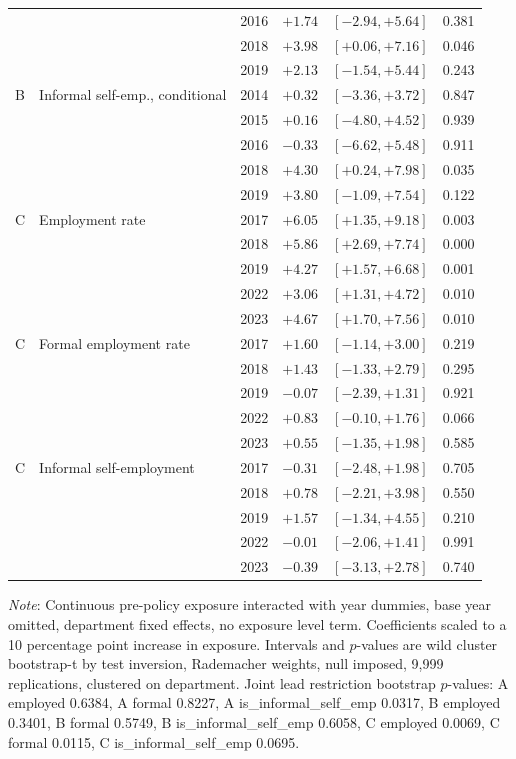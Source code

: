 \begin{table}[H]
\begin{tabular}{llrrrr}
 &  & 2016 & $+1.74$ & $[-2.94, +5.64]$ & 0.381 \\
 &  & 2018 & $+3.98$ & $[+0.06, +7.16]$ & 0.046 \\
 &  & 2019 & $+2.13$ & $[-1.54, +5.44]$ & 0.243 \\
B & Informal self-emp., conditional & 2014 & $+0.32$ & $[-3.36, +3.72]$ & 0.847 \\
 &  & 2015 & $+0.16$ & $[-4.80, +4.52]$ & 0.939 \\
 &  & 2016 & $-0.33$ & $[-6.62, +5.48]$ & 0.911 \\
 &  & 2018 & $+4.30$ & $[+0.24, +7.98]$ & 0.035 \\
 &  & 2019 & $+3.80$ & $[-1.09, +7.54]$ & 0.122 \\
C & Employment rate & 2017 & $+6.05$ & $[+1.35, +9.18]$ & 0.003 \\
 &  & 2018 & $+5.86$ & $[+2.69, +7.74]$ & 0.000 \\
 &  & 2019 & $+4.27$ & $[+1.57, +6.68]$ & 0.001 \\
 &  & 2022 & $+3.06$ & $[+1.31, +4.72]$ & 0.010 \\
 &  & 2023 & $+4.67$ & $[+1.70, +7.56]$ & 0.010 \\
C & Formal employment rate & 2017 & $+1.60$ & $[-1.14, +3.00]$ & 0.219 \\
 &  & 2018 & $+1.43$ & $[-1.33, +2.79]$ & 0.295 \\
 &  & 2019 & $-0.07$ & $[-2.39, +1.31]$ & 0.921 \\
 &  & 2022 & $+0.83$ & $[-0.10, +1.76]$ & 0.066 \\
 &  & 2023 & $+0.55$ & $[-1.35, +1.98]$ & 0.585 \\
C & Informal self-employment & 2017 & $-0.31$ & $[-2.48, +1.98]$ & 0.705 \\
 &  & 2018 & $+0.78$ & $[-2.21, +3.98]$ & 0.550 \\
 &  & 2019 & $+1.57$ & $[-1.34, +4.55]$ & 0.210 \\
 &  & 2022 & $-0.01$ & $[-2.06, +1.41]$ & 0.991 \\
 &  & 2023 & $-0.39$ & $[-3.13, +2.78]$ & 0.740 \\
\bottomrule
\end{tabular}
\begin{minipage}{0.95\textwidth}\small
\textit{Note}: Continuous pre-policy exposure interacted with year dummies, base year omitted, department fixed effects, no exposure level term. Coefficients scaled to a 10 percentage point increase in exposure. Intervals and $p$-values are wild cluster bootstrap-t by test inversion, Rademacher weights, null imposed, 9,999 replications, clustered on department. Joint lead restriction bootstrap $p$-values: A employed 0.6384, A formal 0.8227, A is_informal_self_emp 0.0317, B employed 0.3401, B formal 0.5749, B is_informal_self_emp 0.6058, C employed 0.0069, C formal 0.0115, C is_informal_self_emp 0.0695.
\end{minipage}
\end{table}

